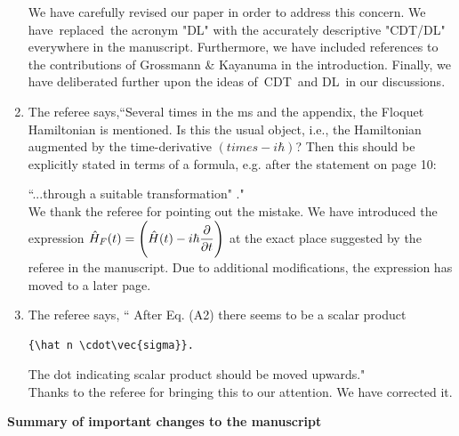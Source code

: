 \documentclass[aps,prb,reprint,showpacs,floatfix,superscriptaddress, onecolumn, nofootinbib, 9pt]{revtex4-2}
\newcommand{\ar}[1]{{\color{blue}#1}} %
\begin{document}
\begin{enumerate}
{We have carefully revised our paper in order to address this concern. We have replaced the acronym "DL" with the accurately descriptive "CDT/DL" everywhere in the manuscript. Furthermore,  we have included references to the contributions of Grossmann \& Kayanuma in the introduction. Finally, we have deliberated further upon the  ideas of CDT and DL in our discussions.
}

\item The referee says,``Several times in the ms and the appendix, the Floquet Hamiltonian is mentioned. Is this the usual object, i.e., the Hamiltonian augmented by the time-derivative $(times -i\hbar)$? Then this should be explicitly stated in terms of a formula, e.g. after the statement on page 10:

``...through a suitable transformation" ."\\

\ar{
We thank the referee for pointing out the mistake. We have introduced the expression $\displaystyle \hat{H}_F(t) = \Bigg(\hat{H}(t) - i\hbar \pdv{t}\Bigg)$ at the exact place suggested by the referee in the manuscript. Due to additional modifications, the expression has moved to a later page.
}
\item The referee says, `` After Eq. (A2) there seems to be a scalar product \begin{verbatim}
{\hat n \cdot\vec{sigma}}.
\end{verbatim} The dot indicating scalar product should be moved upwards."\\

\ar{
Thanks to the referee for bringing this to our attention. We have corrected it.
}
\end{enumerate}
\vskip 1cm 
\noindent \textbf{Summary of important changes to the  manuscript}
\end{document}
